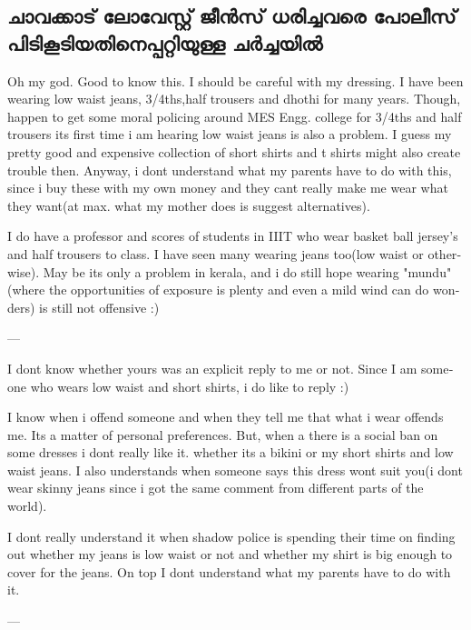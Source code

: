 \subsection*{ചാവക്കാട്  ലോവേസ്റ്റ് ജീന്‍സ് ധരിച്ചവരെ പോലീസ് പിടികൂടിയതിനെപ്പറ്റിയുള്ള ചര്‍ച്ചയില്‍}
\begin{english}

Oh my god. Good to know this. I should be careful with my dressing.
I have been wearing low waist jeans, 3/4ths,half trousers and dhothi
for many years. Though, happen to get some moral policing around MES
Engg. college for 3/4ths and half trousers its first time i am hearing
low waist jeans is also a problem. I guess my pretty good and
expensive collection of short shirts and t shirts might also create
trouble then. Anyway, i dont understand what my parents have to do
with this, since i buy these with my own money and they cant really
make me wear what they want(at max. what my mother does is suggest
alternatives).

I do have a professor and scores of students in IIIT who wear basket
ball jersey's and half trousers to class. I have seen many wearing
jeans too(low waist or otherwise). May be its only a problem in
kerala, and i do still hope wearing "mundu" (where the opportunities
of exposure is plenty and even a mild wind can do wonders) is still
not offensive :)

---

I dont know whether yours was an explicit reply to me or not. Since I
am someone who wears low waist and short shirts, i do like to reply :)

I know when i offend someone and when they tell me that what i wear
offends me. Its a matter of personal preferences. But, when a there is
a social ban on some dresses i dont really like it. whether its a
bikini or my short shirts and low waist jeans. I also understands when
someone says this dress wont suit you(i dont wear skinny jeans since i
got the same comment from different parts of the world).

I dont really understand it when shadow police is spending their time
on finding out whether my jeans is low waist or not and whether my
shirt is big enough to cover for the jeans. On top I dont understand
what my parents have to do with it.

---


\end{english}
